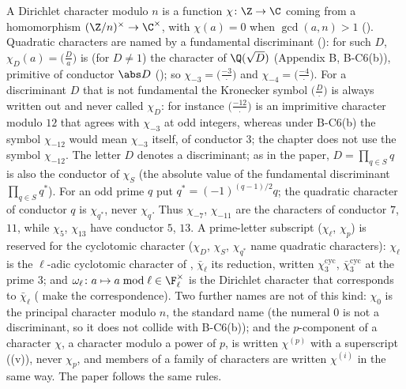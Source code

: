 \begin{convention}\label{conv:rings:characters}
A Dirichlet character modulo $n$ is a function $\chi\colon\Z\to\C$ coming from a homomorphism $(\Z/n)^\times\to\C^\times$, with
$\chi(a)=0$ when $\gcd(a,n)>1$ (). Quadratic characters are named by a fundamental discriminant
(): for such $D$, $\chi_D(a)=\bigl(\frac Da\bigr)$ is (for $D\ne1$) the character of $\Q(\sqrt D)$ (Appendix B, B-C6(b)), primitive of conductor
$\abs D$ (); so $\chi_{-3}=\bigl(\frac{-3}\cdot\bigr)$ and $\chi_{-4}=\bigl(\frac{-4}\cdot\bigr)$. For a discriminant $D$ that is not
fundamental the Kronecker symbol $\bigl(\frac D\cdot\bigr)$ is always written out and never called $\chi_D$: for instance $\bigl(\frac{-12}\cdot\bigr)$ is an imprimitive
character modulo $12$ that agrees with $\chi_{-3}$ at odd integers, whereas under B-C6(b) the symbol $\chi_{-12}$ would mean $\chi_{-3}$ itself, of conductor
$3$; the chapter does not use the symbol $\chi_{-12}$. The letter $D$ denotes a discriminant; as in the paper, $D=\prod_{q\in S}q$ is also the conductor of $\chi_S$
(the absolute value of the fundamental discriminant $\prod_{q\in S}q^*$). For an odd prime $q$
put $q^*=(-1)^{(q-1)/2}q$; the quadratic character of conductor $q$ is $\chi_{q^*}$, never $\chi_q$. Thus $\chi_{-7}$, $\chi_{-11}$ are the characters of conductor $7$, $11$, while $\chi_5$, $\chi_{13}$ have conductor $5$, $13$.
A prime-letter subscript ($\chi_\ell$, $\chi_p$) is reserved for the cyclotomic character ($\chi_D$, $\chi_S$, $\chi_{q^*}$ name quadratic
characters): $\chi_\ell$ is the $\ell$-adic cyclotomic character of
, $\bar\chi_\ell$ its reduction, written $\chi_3^{\mathrm{cyc}}$, $\bar\chi_3^{\mathrm{cyc}}$ at the prime $3$; and
$\omega_\ell\colon a\mapsto a\bmod\ell\in\F_\ell^\times$ is the Dirichlet character that corresponds to $\bar\chi_\ell$ (
make the correspondence). Two further names are not of this kind: $\chi_0$ is the principal character modulo $n$, the standard
name (the numeral $0$ is not a discriminant, so it does not collide with B-C6(b)); and the $p$-component of a character $\chi$, a character
modulo a power of $p$, is written $\chi^{(p)}$ with a superscript ((v)), never $\chi_p$, and members of a family of characters are
written $\chi^{(i)}$ in the same way. The paper
follows the same rules.
\end{convention}

